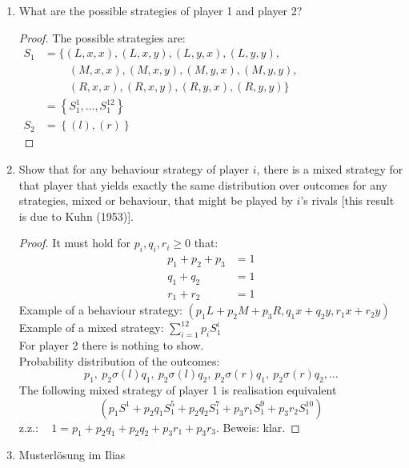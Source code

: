 \documentclass[12pt]{extreport} %
\theoremstyle{named}
\theoremstyle{itshape}
\theoremstyle{normal}
\begin{document}
\begin{enumerate}
	\item What are the possible strategies of player 1 and player 2?
		\begin{proof}
			The possible strategies are:
	  		\begin{align*}
 				S_{1} & = \big\{ (L, x, x), (L, x, y), (L, y, x), (L, y, y), ~\hspace{7cm} \\
 			  		& ~\qquad (M, x, x), (M, x, y), (M, y, x), (M, y, y), \\
 			  		& ~\qquad (R, x, x), (R, x, y), (R, y, x), (R, y, y) \big\} \\
 			  		& = \left\{ S_{1}^{1}, \dotsc, S_{1}^{12} \right\} \\
 				S_{2} & = \left\{ (l), (r) \right\}
 	  		\end{align*}
 	  	\end{proof}
	\item Show that for any behaviour strategy of player $i$, there is a mixed strategy for that player that yields exactly the same distribution over outcomes for any strategies, mixed or behaviour, that might be played by $i$'s rivals [this result is due to Kuhn (1953)].
		\begin{proof}
		  It must hold for $p_i, q_i, r_i \geq 0$ that:
		  \begin{align*}
			p_{1} + p_{2} + p_{3} & = 1 \\
			q_{1} + q_{2} & = 1 \\
			r_{1} + r_{2} & = 1
		  \end{align*}
		  Example of a behaviour strategy: $(p_{1}L + p_{2}M + p_{3}R, q_{1} x + q_{2}y, r_{1}x + r_{2} y)$ \\
		  Example of a mixed strategy: $\sum_{i=1}^{12} p_{i} S_{1}^{i}$ \\
		  For player 2 there is nothing to show. \\ 
		
		  Probability distribution of the outcomes:
		  $$ p_{1}, ~ p_{2} \sigma(l) q_{1}, ~ p_{2} \sigma(l) q_{2}, ~ p_{2} \sigma(r) q_{1}, ~ p_{2} \sigma(r) q_{2}, \dotsc $$
		  The following mixed strategy of player 1 is realisation equivalent
		  $$ \left( p_{1} S^{1} + p_{2} q_{1} S_{1}^{5} + p_{2} q_{2} S_{1}^{7} + p_{3} r_{1} S_{1}^{9} + p_{3} r_{2} S_{1}^{10} \right) $$
		  z.z.: ~ $ 1 = p_{1} + p_{2} q_{1} + p_{2} q_{2} + p_{3} r_{1} + p_{3} r_{3}$. Beweis: klar.
		\end{proof}
	\item Musterlösung im Ilias
\end{enumerate} 
\end{document}

